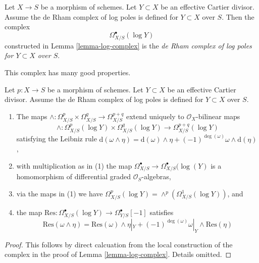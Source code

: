 \begin{definition}
\label{definition-log-complex}
Let $X \to S$ be a morphism of schemes. Let $Y \subset X$ be an
effective Cartier divisor. Assume the de Rham complex of log poles
is defined for $Y \subset X$ over $S$. Then the complex
$$
\Omega^\bullet_{X/S}(\log Y)
$$
constructed in Lemma \ref{lemma-log-complex} is the
{\it de Rham complex of log poles for $Y \subset X$ over $S$}.
\end{definition}

\noindent
This complex has many good properties.

\begin{lemma}
\label{lemma-multiplication-log}
Let $p : X \to S$ be a morphism of schemes. Let $Y \subset X$ be an
effective Cartier divisor. Assume the de Rham complex of log poles
is defined for $Y \subset X$ over $S$.
\begin{enumerate}
\item The maps
$\wedge : \Omega^p_{X/S} \times \Omega^q_{X/S} \to \Omega^{p + q}_{X/S}$
extend uniquely to $\mathcal{O}_X$-bilinear maps
$$
\wedge : \Omega^p_{X/S}(\log Y) \times \Omega^q_{X/S}(\log Y)
\to \Omega^{p + q}_{X/S}(\log Y)
$$
satisfying the Leibniz rule
$
\text{d}(\omega \wedge \eta) = \text{d}(\omega) \wedge \eta +
(-1)^{\deg(\omega)} \omega \wedge \text{d}(\eta)$,
\item with multiplication as in (1) the map
$\Omega^\bullet_{X/S} \to \Omega^\bullet_{X/S}(\log(Y)$
is a homomorphism of differential graded $\mathcal{O}_S$-algebras,
\item via the maps in (1) we have $\Omega^p_{X/S}(\log Y) =
\wedge^p(\Omega^1_{X/S}(\log Y))$, and
\item the map
$\text{Res} : \Omega^\bullet_{X/S}(\log Y) \to \Omega^\bullet_{Y/S}[-1]$
satisfies
$$
\text{Res}(\omega \wedge \eta) =
\text{Res}(\omega) \wedge \eta|_Y +
(-1)^{\deg(\omega)} \omega|_Y \wedge \text{Res}(\eta)
$$
\end{enumerate}
\end{lemma}

\begin{proof}
This follows by direct calcuation from the local construction
of the complex in the proof of Lemma \ref{lemma-log-complex}.
Details omitted.
\end{proof}

